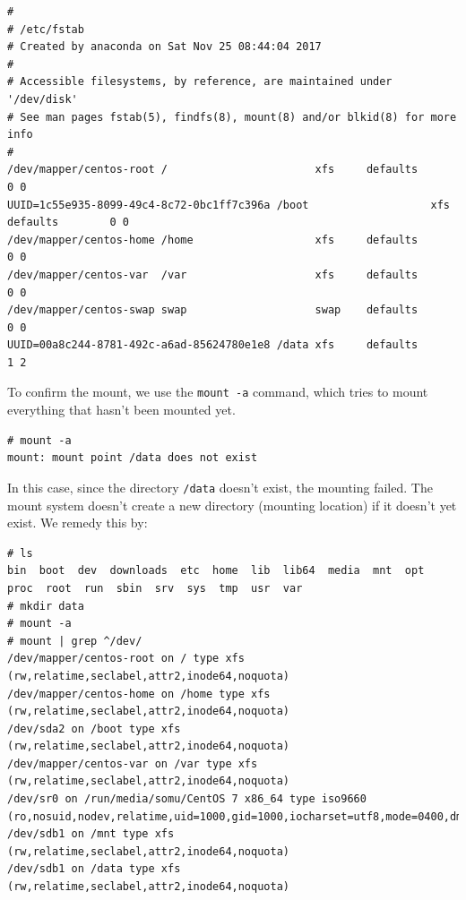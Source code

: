 \vspace{-15pt}
\begin{verbatim}	
#
# /etc/fstab
# Created by anaconda on Sat Nov 25 08:44:04 2017
#
# Accessible filesystems, by reference, are maintained under '/dev/disk'
# See man pages fstab(5), findfs(8), mount(8) and/or blkid(8) for more info
#
/dev/mapper/centos-root /                       xfs     defaults        0 0
UUID=1c55e935-8099-49c4-8c72-0bc1ff7c396a /boot                   xfs     defaults        0 0
/dev/mapper/centos-home /home                   xfs     defaults        0 0
/dev/mapper/centos-var  /var                    xfs     defaults        0 0
/dev/mapper/centos-swap swap                    swap    defaults        0 0
UUID=00a8c244-8781-492c-a6ad-85624780e1e8 /data xfs     defaults        1 2
\end{verbatim}
\vspace{-10pt}

\noindent
To confirm the mount, we use the \verb|mount -a| command, which tries to mount everything that hasn't been mounted yet.

\vspace{-15pt}
\begin{verbatim}
# mount -a
mount: mount point /data does not exist
\end{verbatim}
\vspace{-10pt}

\noindent
In this case, since the directory \verb|/data| doesn't exist, the mounting failed. The mount system doesn't create a new directory (mounting location) if it doesn't yet exist. We remedy this by:

\vspace{-15pt}
\begin{verbatim}
# ls
bin  boot  dev  downloads  etc  home  lib  lib64  media  mnt  opt  proc  root  run  sbin  srv  sys  tmp  usr  var
# mkdir data
# mount -a 
# mount | grep ^/dev/
/dev/mapper/centos-root on / type xfs (rw,relatime,seclabel,attr2,inode64,noquota)
/dev/mapper/centos-home on /home type xfs (rw,relatime,seclabel,attr2,inode64,noquota)
/dev/sda2 on /boot type xfs (rw,relatime,seclabel,attr2,inode64,noquota)
/dev/mapper/centos-var on /var type xfs (rw,relatime,seclabel,attr2,inode64,noquota)
/dev/sr0 on /run/media/somu/CentOS 7 x86_64 type iso9660 (ro,nosuid,nodev,relatime,uid=1000,gid=1000,iocharset=utf8,mode=0400,dmode=0500,uhelper=udisks2)
/dev/sdb1 on /mnt type xfs (rw,relatime,seclabel,attr2,inode64,noquota)
/dev/sdb1 on /data type xfs (rw,relatime,seclabel,attr2,inode64,noquota)
\end{verbatim}
\vspace{-10pt}

